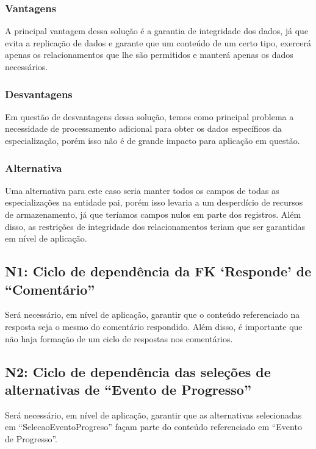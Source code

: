 \subsubsection{Vantagens}

A principal vantagem dessa solução é a garantia de integridade dos dados, já
que evita a replicação de dados e garante que um conteúdo de um certo tipo,
exercerá apenas os relacionamentos que lhe são permitidos e manterá apenas os
dados necessários.

\subsubsection{Desvantagens}

Em questão de desvantagens dessa solução, temos como principal problema a
necessidade de processamento adicional para obter os dados específicos da
especialização, porém isso não é de grande impacto para aplicação em questão.

\subsubsection{Alternativa}

Uma alternativa para este caso seria manter todos os campos de todas as
especializações na entidade pai, porém isso levaria a um desperdício de
recursos de armazenamento, já que teríamos campos nulos em parte dos registros.
Além disso, as restrições de integridade dos relacionamentos teriam que ser
garantidas em nível de aplicação.

\subsection{\textbf{N1:} Ciclo de dependência da FK `Responde' de ``Comentário''}

Será necessário, em nível de aplicação, garantir que o conteúdo referenciado na
resposta seja o mesmo do comentário respondido. Além disso, é importante que
não haja formação de um ciclo de respostas nos comentários.

\subsection{\textbf{N2:} Ciclo de dependência das seleções de alternativas de ``Evento de Progresso''}

Será necessário, em nível de aplicação, garantir que as alternativas
selecionadas em ``SelecaoEventoProgreso'' façam parte do conteúdo referenciado
em ``Evento de Progresso''.

